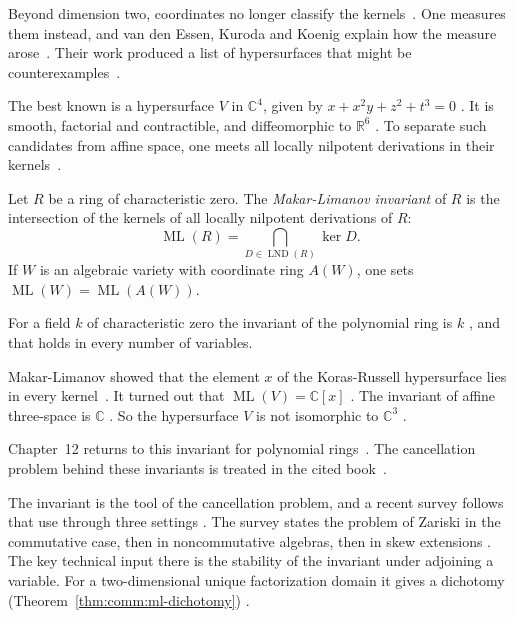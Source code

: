 Beyond dimension two, coordinates no longer classify the
kernels~\cite[p.~65]{VanEssenKurodaKoenig2021}. One measures them instead, and
van den Essen, Kuroda and Koenig explain how the measure
arose~\cite[p.~65]{VanEssenKurodaKoenig2021}. Their work produced a list of
hypersurfaces that might be
counterexamples~\cite[p.~65]{VanEssenKurodaKoenig2021}.

The best known is a hypersurface $V$ in $\mathbb{C}^4$, given by $x + x^2 y +
z^2 + t^3 = 0$ \cite[p.~65]{VanEssenKurodaKoenig2021}. It is smooth, factorial
and contractible, and diffeomorphic to $\mathbb{R}^6$
\cite[p.~65]{VanEssenKurodaKoenig2021}. To separate such candidates from
affine space, one meets all locally nilpotent derivations in their
kernels~\cite[p.~65]{VanEssenKurodaKoenig2021}.

\begin{definition}\label{def:comm:ml}
Let $R$ be a ring of characteristic zero. The \emph{Makar-Limanov invariant}
of $R$ is the intersection of the kernels of all locally nilpotent
derivations of $R$:
\[
\operatorname{ML}(R) = \bigcap_{D \in \operatorname{LND}(R)} \ker D .
\]
If $W$ is an algebraic variety with coordinate ring $A(W)$, one sets
$\operatorname{ML}(W) = \operatorname{ML}(A(W))$.
\end{definition}

For a field $k$ of characteristic zero the invariant of the polynomial ring is
$k$ \cite[Example~3.1.2, p.~66]{VanEssenKurodaKoenig2021}, and that holds in
every number of variables.

Makar-Limanov showed that the element $x$ of the Koras-Russell hypersurface
lies in every kernel~\cite[p.~66]{VanEssenKurodaKoenig2021}. It turned out
that $\operatorname{ML}(V) = \mathbb{C}[x]$
\cite[p.~66]{VanEssenKurodaKoenig2021}. The invariant of affine three-space is
$\mathbb{C}$ \cite[p.~66]{VanEssenKurodaKoenig2021}. So the hypersurface $V$
is not isomorphic to $\mathbb{C}^3$ \cite[p.~66]{VanEssenKurodaKoenig2021}.

Chapter~12 returns to this invariant for polynomial
rings~\cite[p.~65]{VanEssenKurodaKoenig2021}. The cancellation problem behind
these invariants is treated in the cited
book~\cite[p.~65]{VanEssenKurodaKoenig2021}.

The invariant is the tool of the cancellation problem, and a recent survey
follows that use through three settings
\cite[pp.~1--3]{VenegasVenegas2025Cancellation}. The survey states the problem
of Zariski in the commutative case, then in noncommutative algebras, then in
skew extensions \cite[pp.~1--3]{VenegasVenegas2025Cancellation}. The key
technical input there is the stability of the invariant under adjoining a
variable. For a two-dimensional unique factorization domain it gives a
dichotomy (Theorem~\ref{thm:comm:ml-dichotomy}) \cite[Theorem~2.2,
p.~7]{VenegasVenegas2025Cancellation}.

